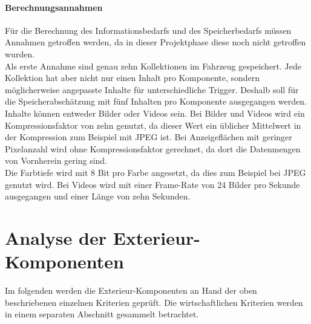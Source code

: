 \paragraph{Berechnungsannahmen}
Für die Berechnung des Informationsbedarfs und des Speicherbedarfs müssen Annahmen getroffen werden, da in dieser Projektphase diese noch nicht getroffen wurden. \\
Als erste Annahme sind genau zehn Kollektionen im Fahrzeug gespeichert. Jede Kollektion hat aber nicht nur einen Inhalt pro Komponente, sondern möglicherweise angepasste Inhalte für unterschiedliche Trigger. Deshalb soll für die Speicherabschätzung mit fünf Inhalten pro Komponente ausgegangen werden.\\
Inhalte können entweder Bilder oder Videos sein.
Bei Bilder und Videos wird ein Kompressionsfaktor von zehn genutzt, da dieser Wert ein üblicher Mittelwert in der Kompression zum Beispiel mit JPEG ist. Bei Anzeigeflächen mit geringer Pixelanzahl wird ohne Kompressionsfaktor gerechnet, da dort die Datenmengen von Vornherein gering sind. \\
Die Farbtiefe wird mit 8 Bit pro Farbe angesetzt, da dies zum Beispiel bei JPEG genutzt wird.
Bei Videos wird mit einer Frame-Rate von 24 Bilder pro Sekunde ausgegangen und einer Länge von zehn Sekunden.
\section{Analyse der Exterieur-Komponenten}
Im folgenden werden die Exterieur-Komponenten an Hand der oben beschriebenen einzelnen Kriterien geprüft. Die wirtschaftlichen Kriterien werden in einem separaten Abschnitt gesammelt betrachtet. 
